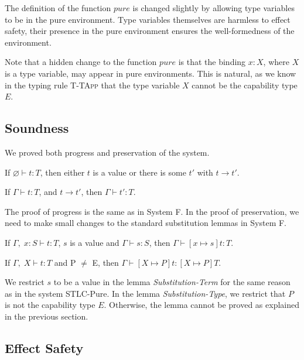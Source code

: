 The definition of the function $pure$ is changed slightly by allowing
type variables to be in the pure environment. Type variables
themselves are harmless to effect safety, their presence in the pure
environment ensures the well-formedness of the environment.

Note that a hidden change to the function $pure$ is that the binding
$x:X$, where $X$ is a type variable, may appear in pure environments.
This is natural, as we know in the typing rule \textsc{T-TApp} that
the type variable $X$ cannot be the capability type $E$.

\subsection{Soundness}

We proved both progress and preservation of the system.

\begin{theorem}[Progress]
If $\varnothing \vdash t : T$, then either $t$ is a value or there is some
$t'$ with $t \longrightarrow t'$.
\end{theorem}

\begin{theorem}[Preservation]
If $\Gamma \vdash t : T$, and $t \longrightarrow t'$, then $\Gamma
\vdash t' : T$.
\end{theorem}

The proof of progress is the same as in System F. In the proof of
preservation, we need to make small changes to the standard
substitution lemmas in System F.

\begin{lemma}
  If $\Gamma,\; x:S \vdash t : T$, $s$ is a value and
  $\Gamma \vdash s : S$, then $\Gamma \vdash [x \mapsto s]t : T$.
\end{lemma}

\begin{lemma}
  If $\Gamma,\; X \vdash t : T$ and P $\neq$ E,
  then $\Gamma \vdash [X \mapsto P]t : [X \mapsto P]T$.
\end{lemma}

We restrict $s$ to be a value in the lemma \emph{Substitution-Term}
for the same reason as in the system STLC-Pure. In the lemma
\emph{Substitution-Type}, we restrict that $P$ is not the capability
type $E$. Otherwise, the lemma cannot be proved as explained in the
previous section.

\subsection{Effect Safety}

